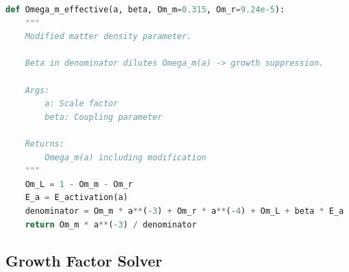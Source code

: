 \documentclass[11pt]{article}
\begin{document}
\begin{lstlisting}[language=Python]
def Omega_m_effective(a, beta, Om_m=0.315, Om_r=9.24e-5):
    """
    Modified matter density parameter.
    
    Beta in denominator dilutes Omega_m(a) -> growth suppression.
    
    Args:
        a: Scale factor
        beta: Coupling parameter
    
    Returns:
        Omega_m(a) including modification
    """
    Om_L = 1 - Om_m - Om_r
    E_a = E_activation(a)
    denominator = Om_m * a**(-3) + Om_r * a**(-4) + Om_L + beta * E_a
    return Om_m * a**(-3) / denominator
\end{lstlisting}

\subsection{Growth Factor Solver}
\end{document}
